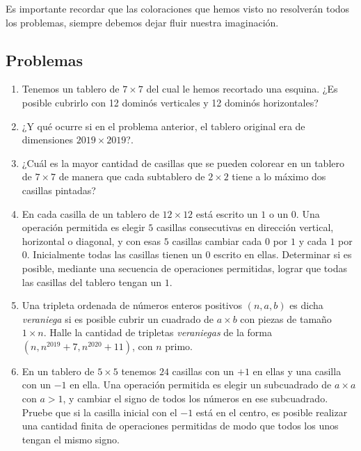 Es importante recordar que las coloraciones que hemos visto no resolver\'an todos los problemas, siempre debemos dejar fluir nuestra imaginaci\'on.

\subsection{Problemas}

\begin{enumerate}
	\item Tenemos un tablero de $7 \times 7$ del cual le hemos recortado una esquina. ¿Es posible cubrirlo con 12 domin\'os verticales y 12 domin\'os horizontales?
	
	\item ¿Y qu\'e ocurre si en el problema anterior, el tablero original era de dimensiones $2019 \times 2019$?.
	
	\item ¿Cu\'al es la mayor cantidad de casillas que se pueden colorear en un tablero de $7 \times 7 $ de manera que cada subtablero de $2 \times 2$ tiene a lo m\'aximo dos casillas pintadas?
	
	
	\item En cada casilla de un tablero de $12 \times 12$ est\'a escrito un $1$ o un $0$. Una operaci\'on permitida es elegir $5$ casillas consecutivas en direcci\'on vertical, horizontal o diagonal, y con esas $5$ casillas cambiar cada $0$ por $1$ y cada $1$ por $0$. Inicialmente todas las casillas tienen un $0$ escrito en ellas. Determinar si es posible, mediante una secuencia de operaciones permitidas, lograr que todas las casillas del tablero tengan un $1$.
	
	\item Una tripleta ordenada de n\'umeros enteros positivos $(n,a, b)$ es dicha \textit{veraniega} si es posible cubrir un cuadrado de $a \times b$ con piezas de tamaño $1\times n$. Halle la cantidad de tripletas \textit{veraniegas} de la forma $(n, n^{2019}+7, n^{2020}+11)$, con $n$ primo.
	
	\item En un tablero de $5\times 5$ tenemos $24$ casillas con un $ +1$ en ellas y una casilla con un $-1$ en ella. Una operaci\'on permitida es elegir un subcuadrado de $a\times a$ con $a>1$, y cambiar el signo de todos los n\'umeros en ese subcuadrado. Pruebe que si la casilla inicial con el $-1$ est\'a en el centro, es posible realizar una cantidad finita de operaciones permitidas de modo que todos los unos tengan el mismo signo.
	

\end{enumerate}
